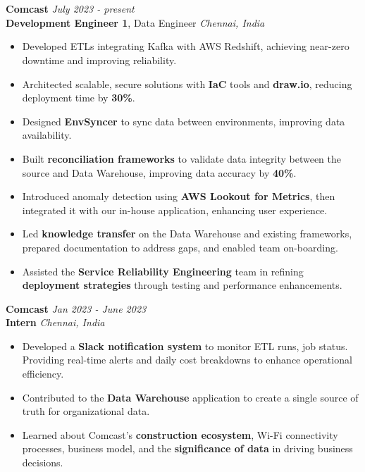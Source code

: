 \documentclass[a4paper,10pt]{article}
\begin{document}
\section{\scshape\color{Fuchsia}{\faUserTie\ \textbf EXPERIENCE}}
\textbf{Comcast} \href{https://corporate.comcast.com/}{} \hfill
\textit{July 2023 - present} \\
\textbf{Development Engineer 1}, Data Engineer \hfill \textit{Chennai, India}
\vspace{-2mm}
\begin{itemize}
    \item Developed ETLs integrating Kafka with AWS Redshift, achieving near-zero downtime and improving reliability.
    \vspace{-2mm}
    \item Architected scalable, secure solutions with \textbf{IaC} tools and \textbf{draw.io}, reducing deployment time by \textbf{30\%}.
    \vspace{-2mm}
    \item Designed \textbf{EnvSyncer} to sync data between environments, improving data availability.
    \vspace{-2mm}
    \item Built \textbf{reconciliation frameworks} to validate data integrity between the source and Data Warehouse, improving data accuracy by \textbf{40\%}.
    \vspace{-2mm}
    \item Introduced anomaly detection using \textbf{AWS Lookout for Metrics}, then integrated it with our in-house application, enhancing user experience.
    \vspace{-2mm}
    \item Led \textbf{knowledge transfer} on the Data Warehouse and existing frameworks, prepared documentation to address gaps, and enabled team on-boarding.
    \vspace{-2mm}
    \item Assisted the \textbf{Service Reliability Engineering} team in refining \textbf{deployment strategies} through testing and performance enhancements.
\end{itemize}
\textbf{Comcast} \href{https://drive.google.com/file/d/1pad_OUtVNHKm3s1Kb-_xwyZAXJBjz7gX/view?usp=sharing}{} \hfill \textit{Jan 2023 - June 2023} \\
\textbf{Intern} \hfill \textit{Chennai, India}
\vspace{-2mm}
\begin{itemize}
    \item Developed a \textbf{Slack notification system} to monitor ETL runs, job status. Providing real-time alerts and daily cost breakdowns to enhance operational efficiency.
    \vspace{-2mm}
    \item Contributed to the \textbf{Data Warehouse} application to create a single source of truth for organizational data.
    \vspace{-2mm}
    \item Learned about Comcast's \textbf{construction ecosystem}, Wi-Fi connectivity processes, business model, and the \textbf{significance of data} in driving business decisions.
\end{itemize}
\end{document}
